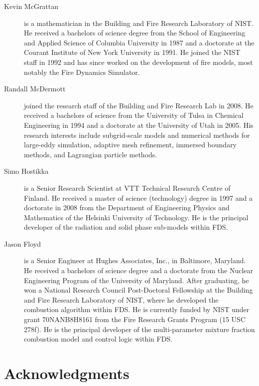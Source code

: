 \documentclass[11pt]{book}
\begin{document}
\begin{description}
\item[Kevin McGrattan] is a mathematician in the Building and Fire
Research Laboratory of NIST. He received a bachelors of science degree
from the School of Engineering and Applied Science of Columbia
University in 1987 and a doctorate at the Courant Institute of New
York University in 1991. He joined the NIST staff in 1992 and has
since worked on the development of fire models, most notably the Fire
Dynamics Simulator.
\item[Randall McDermott] joined the research staff of the Building and Fire Research Lab in 2008. He received a bachelors of science from the University of Tulsa in Chemical Engineering in 1994 and a doctorate at the University of Utah in 2005. His research interests include subgrid-scale models and numerical methods for large-eddy simulation, adaptive mesh refinement, immersed boundary methods, and Lagrangian particle methods.
\item[Simo Hostikka] is a Senior Research Scientist at VTT Technical
Research Centre of Finland. He received a master of science
(technology) degree in 1997 and a doctorate in 2008 from
the Department of Engineering Physics and Mathematics of the
Helsinki University of Technology.  He is the principal developer of the
radiation and solid phase sub-models within FDS.
\item[Jason Floyd] is a Senior Engineer at Hughes Associates, Inc., in
Baltimore, Maryland. He received a bachelors of science degree and a
doctorate from the Nuclear Engineering Program of the University of
Maryland. After graduating, he won a National Research Council
Post-Doctoral Fellowship at the Building and Fire Research Laboratory
of NIST, where he developed the combustion algorithm within FDS. He is
currently funded by NIST under grant 70NANB8H8161 from the Fire
Research Grants Program (15 USC 278f).  He is the principal developer
of the multi-parameter mixture fraction combustion model and control
logic within FDS.
\end{description}




\chapter{Acknowledgments}

\label{acksection}
\end{document}
